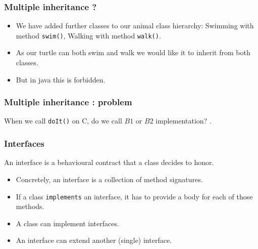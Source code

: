\documentclass[10pt, handout]{beamer}
\begin{document}
\begin{frame}[fragile]
  \frametitle{Multiple inheritance ?}
  \begin{itemize}
    \item We have added further classes to our animal class hierarchy:
      Swimming with method \verb!swim()!, Walking with
      method \verb!walk()!.
     \item As our turtle can both swim and walk we would like it to
       inherit from both classes.
     \item But in java this is \alert{forbidden}.
  \end{itemize}
\end{frame}

\begin{frame}[fragile]
  \frametitle{Multiple inheritance : problem}
  \begin{center}
  \end{center}
  \alert{When we call \verb!doIt()! on C, do we call $B1$ or $B2$
    implementation?}
  \pause
  .
\end{frame}

\begin{frame}[fragile]
  \frametitle{Interfaces}
  \begin{definition}
    An interface is a \alert{behavioural contract} that a class
    decides to honor.
    \begin{itemize}
    \item Concretely, an interface is a collection of method signatures.
    \item If a class \alert{\verb!implements!} an interface, it has to
      provide a body for each of those methods.
    \item A class can implement  interfaces.
    \item An interface can extend another (single) interface.
     \end{itemize}
 \end{definition}
 \pause
\end{frame}
\end{document}
